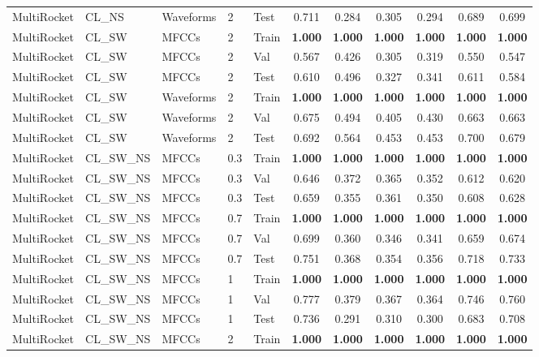 \begin{landscape}
\begin{longtable}{|l|l|l|l|l|c|c|c|c|c|c|}
MultiRocket & CL\_NS & Waveforms & 2 & Test & 0.711 & 0.284 & 0.305 & 0.294 & 0.689 & 0.699 \\
MultiRocket & CL\_SW & MFCCs & 2 & Train & \textbf{1.000} & \textbf{1.000} & \textbf{1.000} & \textbf{1.000} & \textbf{1.000} & \textbf{1.000} \\
MultiRocket & CL\_SW & MFCCs & 2 & Val & 0.567 & 0.426 & 0.305 & 0.319 & 0.550 & 0.547 \\
MultiRocket & CL\_SW & MFCCs & 2 & Test & 0.610 & 0.496 & 0.327 & 0.341 & 0.611 & 0.584 \\
MultiRocket & CL\_SW & Waveforms & 2 & Train & \textbf{1.000} & \textbf{1.000} & \textbf{1.000} & \textbf{1.000} & \textbf{1.000} & \textbf{1.000} \\
MultiRocket & CL\_SW & Waveforms & 2 & Val & 0.675 & 0.494 & 0.405 & 0.430 & 0.663 & 0.663 \\
MultiRocket & CL\_SW & Waveforms & 2 & Test & 0.692 & 0.564 & 0.453 & 0.453 & 0.700 & 0.679 \\
MultiRocket & CL\_SW\_NS & MFCCs & 0.3 & Train & \textbf{1.000} & \textbf{1.000} & \textbf{1.000} & \textbf{1.000} & \textbf{1.000} & \textbf{1.000} \\
MultiRocket & CL\_SW\_NS & MFCCs & 0.3 & Val & 0.646 & 0.372 & 0.365 & 0.352 & 0.612 & 0.620 \\
MultiRocket & CL\_SW\_NS & MFCCs & 0.3 & Test & 0.659 & 0.355 & 0.361 & 0.350 & 0.608 & 0.628 \\
MultiRocket & CL\_SW\_NS & MFCCs & 0.7 & Train & \textbf{1.000} & \textbf{1.000} & \textbf{1.000} & \textbf{1.000} & \textbf{1.000} & \textbf{1.000} \\
MultiRocket & CL\_SW\_NS & MFCCs & 0.7 & Val & 0.699 & 0.360 & 0.346 & 0.341 & 0.659 & 0.674 \\
MultiRocket & CL\_SW\_NS & MFCCs & 0.7 & Test & 0.751 & 0.368 & 0.354 & 0.356 & 0.718 & 0.733 \\
MultiRocket & CL\_SW\_NS & MFCCs & 1 & Train & \textbf{1.000} & \textbf{1.000} & \textbf{1.000} & \textbf{1.000} & \textbf{1.000} & \textbf{1.000} \\
MultiRocket & CL\_SW\_NS & MFCCs & 1 & Val & 0.777 & 0.379 & 0.367 & 0.364 & 0.746 & 0.760 \\
MultiRocket & CL\_SW\_NS & MFCCs & 1 & Test & 0.736 & 0.291 & 0.310 & 0.300 & 0.683 & 0.708 \\
MultiRocket & CL\_SW\_NS & MFCCs & 2 & Train & \textbf{1.000} & \textbf{1.000} & \textbf{1.000} & \textbf{1.000} & \textbf{1.000} & \textbf{1.000} \\

\end{longtable}
\end{landscape}
